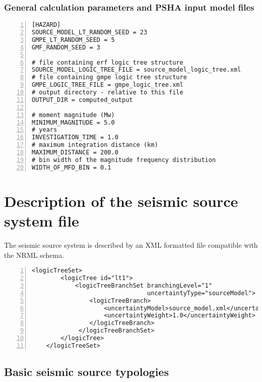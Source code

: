 \subsubsection{General calculation parameters and PSHA input model files}
%
\begin{Verbatim}[baselinestretch=1,fontsize=\small,numbers=left,frame=single]
[HAZARD]
SOURCE_MODEL_LT_RANDOM_SEED = 23
GMPE_LT_RANDOM_SEED = 5
GMF_RANDOM_SEED = 3

# file containing erf logic tree structure
SOURCE_MODEL_LOGIC_TREE_FILE = source_model_logic_tree.xml
# file containing gmpe logic tree structure
GMPE_LOGIC_TREE_FILE = gmpe_logic_tree.xml
# output directory - relative to this file
OUTPUT_DIR = computed_output

# moment magnitude (Mw)
MINIMUM_MAGNITUDE = 5.0
# years
INVESTIGATION_TIME = 1.0
# maximum integration distance (km)
MAXIMUM_DISTANCE = 200.0
# bin width of the magnitude frequency distribution
WIDTH_OF_MFD_BIN = 0.1
\end{Verbatim}

%
\section{Description of the seismic source system file}
The seismic source system is described by an XML formatted file 
compatible with the NRML schema.
%
\begin{Verbatim}[baselinestretch=1,fontsize=\small,numbers=left,frame=single]
	<logicTreeSet>
        <logicTree id="lt1">
            <logicTreeBranchSet branchingLevel="1" 
                                uncertaintyType="sourceModel">
                <logicTreeBranch>
                    <uncertaintyModel>source_model.xml</uncertaintyModel>
                    <uncertaintyWeight>1.0</uncertaintyWeight>
                </logicTreeBranch>
             </logicTreeBranchSet>
        </logicTree>
    </logicTreeSet>
\end{Verbatim}
%
\subsection{Basic seismic source typologies }

%
